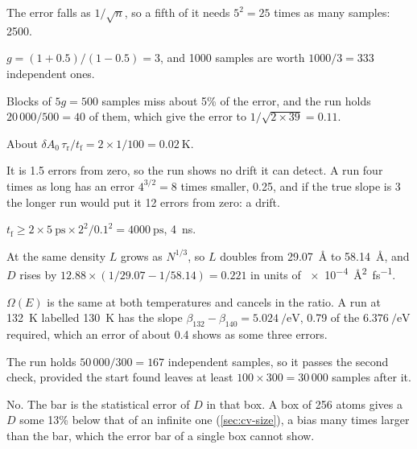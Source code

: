 \label{sec:cv-answers}

The error falls as $1/\sqrt n$, so a fifth of it
needs $5^2 = 25$ times as many samples: 2500.

$g = (1 + 0.5)/(1 - 0.5) = 3$, and 1000
samples are worth $1000/3 = 333$ independent ones.

Blocks of $5g = 500$ samples miss about 5\% of
the error, and the run holds $20\,000/500 = 40$ of them, which give the
error to $1/\sqrt{2\times39} = 0.11$.

About $\delta A_0\,\tau_{\mathrm r}/t_{\mathrm f} = 2\times
1/100 = \SI{0.02}{\kelvin}$.

It is 1.5 errors from zero, so the run shows no drift
it can detect. A run four times as long has an error $4^{3/2} = 8$ times
smaller, 0.25, and if the true slope is 3 the longer run would put it 12
errors from zero: a drift.

$t_{\mathrm f} \ge 2\times\SI{5}{\pico\second}\times2^2/
0.1^2 = \SI{4000}{\pico\second}$, \SI{4}{\nano\second}.

At the same density $L$ grows as $N^{1/3}$, so $L$
doubles from \SI{29.07}{\angstrom} to \SI{58.14}{\angstrom}, and $D$ rises
by $12.88\times(1/29.07 - 1/58.14) = 0.221$ in units of
\SI{e-4}{\angstrom\squared\per\femto\second}.

$\Omega(E)$ is the same at both temperatures and
cancels in the ratio. A run at \SI{132}{\kelvin} labelled \SI{130}{\kelvin}
has the slope $\beta_{132} - \beta_{140} = \SI{5.024}{\per\electronvolt}$,
0.79 of the $\SI{6.376}{\per\electronvolt}$ required, which an error of
about 0.4 shows as some three errors.

The run holds $50\,000/300 = 167$ independent
samples, so it passes the second check, provided the start found leaves at
least $100\times300 = 30\,000$ samples after it.

No. The bar is the statistical error of $D$ in
that box. A box of 256 atoms gives a $D$ some 13\% below that of an
infinite one (\cref{sec:cv-size}), a bias many times larger than the bar,
which the error bar of a single box cannot show.
